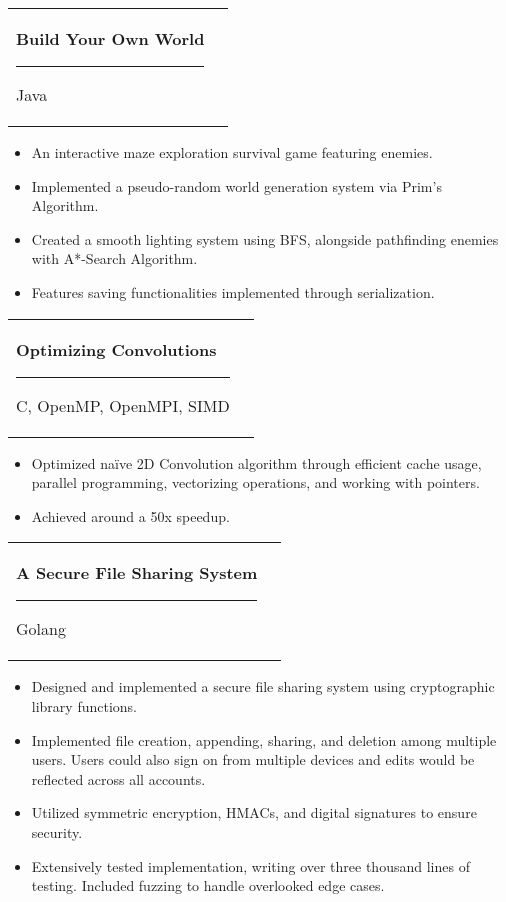 \documentclass[letterpaper,11pt]{article}
\makeatletter
\newcommand{\resumeItem}[2]{
	\item\small{
		\textbf{#1}{: #2 \vspace{-2pt}}
	}
}
\newcommand{\resumeItemTwo}[1]{
	\item\small{
		#1 \vspace{-2pt}}
}
\newcommand{\resumeSubheadingTwo}[2]{
	\vspace{-1pt}\item
	\begin{tabular*}{0.97\textwidth}[t]{l@{\extracolsep{\fill}}r}
		\textbf{#1} \rule[-0.4ex]{0.1ex}{1.2em} #2 \\
	\end{tabular*}\vspace{-5pt}
}
\newcommand{\resumeSubSubheading}[2]{
	\begin{tabular*}{0.97\textwidth}{l@{\extracolsep{\fill}}r}
		\textit{\small#1} & \textit{\small #2} \\
	\end{tabular*}\vspace{-5pt}
}
\newcommand{\resumeItemListStart}{\begin{itemize}}
\newcommand{\resumeItemListEnd}{\end{itemize}\vspace{-5pt}}
\makeatother
\begin{document}
	\resumeSubheadingTwo
	{Build Your Own World}{Java}
	\resumeItemListStart
	\resumeItemTwo{An interactive maze exploration survival game featuring enemies.}
	\resumeItemTwo{Implemented a pseudo-random world generation system via Prim's Algorithm.}
	\resumeItemTwo{Created a smooth lighting system using BFS, alongside pathfinding enemies with A*-Search Algorithm.}
	\resumeItemTwo{Features saving functionalities implemented through serialization.}
	\resumeItemListEnd
	
	
	
	\resumeSubheadingTwo
	{Optimizing Convolutions}{C, OpenMP, OpenMPI, SIMD}
	\resumeItemListStart
	\resumeItemTwo{Optimized na\"ive 2D Convolution algorithm through efficient cache usage, parallel programming, vectorizing operations, and working with pointers.}
	\resumeItemTwo{Achieved around a 50x speedup.}
	\resumeItemListEnd
	
	\resumeSubheadingTwo
	{A Secure File Sharing System}{Golang}
	\resumeItemListStart
	\resumeItemTwo{Designed and implemented a secure file sharing system using cryptographic library functions.}
	\resumeItemTwo{Implemented file creation, appending, sharing, and deletion among multiple users. Users could also sign on from multiple devices and edits would be reflected across all accounts.}
	\resumeItemTwo{Utilized symmetric encryption, HMACs, and digital signatures to ensure security.}
	\resumeItemTwo{Extensively tested implementation, writing over three thousand lines of testing. Included fuzzing to handle overlooked edge cases.}
	\resumeItemListEnd
	
\end{document}
